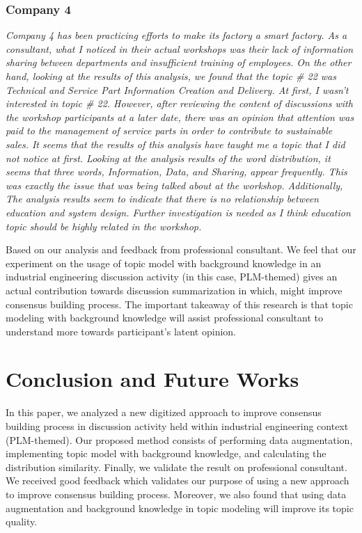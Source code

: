\documentclass[10pt, conference, compsocconf]{IEEEtran}
\begin{document}
\subsubsection{Company 4}
{\it Company 4 has been practicing efforts to make its factory a smart factory. As a consultant, what I noticed in their actual workshops was their lack of information sharing between departments and insufficient training of employees. On the other hand, looking at the results of this analysis, we found that the topic \# 22 was Technical and Service Part Information Creation and Delivery. At first, I wasn't interested in topic \# 22. However, after reviewing the content of discussions with the workshop participants at a later date, there was an opinion that attention was paid to the management of service parts in order to contribute to sustainable sales. It seems that the results of this analysis have taught me a topic that I did not notice at first. Looking at the analysis results of the word distribution, it seems that three words, Information, Data, and Sharing, appear frequently. This was exactly the issue that was being talked about at the workshop. Additionally, The analysis results seem to indicate that there is no relationship between education and system design. Further investigation is needed as I think education topic should be highly related in the workshop.}
\medskip

Based on our analysis and feedback from professional consultant. We feel that our experiment on the usage of topic model with background knowledge in an industrial engineering discussion activity (in this case, PLM-themed) gives an actual contribution towards discussion summarization in which, might improve consensus building process. The important takeaway of this  research is that topic modeling with background knowledge will assist professional consultant to understand more towards participant's latent opinion.

\section{Conclusion and Future Works}
In this paper, we analyzed a new digitized approach to improve consensus building process in discussion activity held within industrial engineering context (PLM-themed). Our proposed method consists of performing data augmentation, implementing topic model with background knowledge, and calculating the distribution similarity. Finally, we validate the result on professional consultant. We received good feedback which validates our purpose of using a new approach to improve consensus building process. Moreover, we also found that using data augmentation and background knowledge in topic modeling will improve its topic quality.
\end{document}
